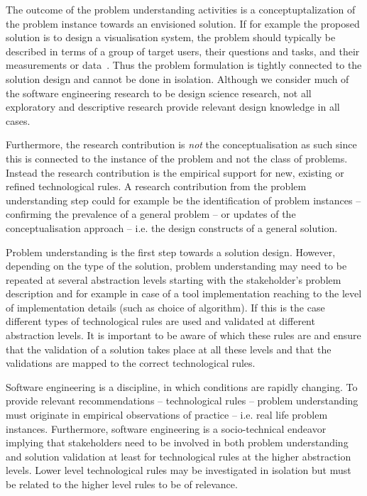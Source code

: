 \documentclass[graybox]{svmult}
\begin{document}
The outcome of the problem understanding activities is a conceptuptalization of the problem instance towards an envisioned solution. If for example the proposed solution is to design a visualisation system, the problem should typically be described in terms of a group of target users, their questions and tasks, and their measurements or data~\cite{meyer_nested_2015}. Thus the problem formulation is tightly connected to the solution design and cannot be done in isolation. Although we consider much of the software engineering research to be design science research, not all exploratory and descriptive research provide relevant design knowledge in all cases.


Furthermore, the research contribution is \emph{not} the conceptualisation as such since this is connected to the instance of the problem and not the class of problems. Instead the research contribution is the empirical support for new, existing or refined technological rules. A research contribution from the problem understanding step could for example be the identification of problem instances -- confirming the prevalence of a general problem -- or updates of the conceptualisation approach -- i.e. the design constructs of a general solution.


Problem understanding is the first step towards a solution design. However, depending on the type of the solution, problem understanding may need to be repeated at several abstraction levels starting with the stakeholder's problem description and for example in case of a tool implementation reaching to the level of implementation details (such as  choice of algorithm). If this is the case different types of technological rules are used and validated at different abstraction levels. It is important to be aware of which these rules are and ensure that the validation of a solution takes place at all these levels and that the validations are mapped to the correct technological rules. 

Software engineering is a discipline, in which conditions are rapidly changing. To provide relevant recommendations -- technological rules -- problem understanding must originate in empirical observations of practice -- i.e. real life problem instances. Furthermore, software engineering is a socio-technical endeavor implying that stakeholders need to be involved in both problem understanding and solution validation at least for technological rules at the higher abstraction levels. Lower level technological rules may be investigated in isolation but must be related to the higher level rules to be of relevance. 
\end{document}
